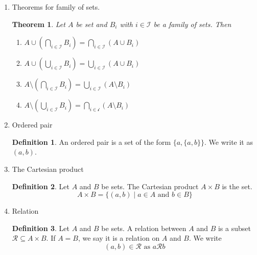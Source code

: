 \documentclass{article}
\theoremstyle{claim}
\newtheorem{theorem}{Theorem}[section]
\theoremstyle{definition}
\newtheorem{definition}{Definition}
\begin{document}
\begin{enumerate}
    \item[31.] Theorems for family of sets.
        \begin{theorem}
            Let $A$ be set and $B_i$ with $i \in \mathcal{I}$ be a family of sets. Then
            \begin{enumerate}
                \item[1.] $A \cup ( \bigcap\limits_{i \in \mathcal{I}} B_i ) = \bigcap\limits_{i \in \mathcal{I}} (A \cup B_i)$
                \item[2.] $A \cup ( \bigcup\limits_{i \in \mathcal{I}} B_i) = \bigcup\limits_{i \in \mathcal{I}} (A \cup B_i)$
                \item[3.] $A \setminus ( \bigcap\limits_{i \in \mathcal{I}} B_i ) = \bigcup\limits_{i \in \mathcal{I}} (A \setminus B_i)$
                \item[4.] $A \setminus ( \bigcup\limits_{i \in \mathcal{I}} B_i ) = \bigcap\limits_{i \in \mathcal{i}} (A \setminus B_i)$
            \end{enumerate}
        \end{theorem}

    \item[32.] Ordered pair
        \begin{definition}
            An ordered pair is a set of the form $\{ a, \{a, b\} \}$. We write it as $(a, b)$.
        \end{definition}

    \item[33.] The Cartesian product
        \begin{definition}
            Let $A$ and $B$ be sets. The Cartesian product $A \times B$ is the set.
            \begin{equation*}
                A \times B = \{ (a, b) \mid a \in A \text{ and } b \in B \}
            \end{equation*}
        \end{definition}

    \item[34.] Relation
        \begin{definition}
            Let $A$ and $B$ be sets. A relation between $A$ and $B$ is a subset $\mathcal{R} \subseteq A \times B$. If $A = B$, we say it is a relation on $A$ and $B$. We write
            \begin{equation*}
                (a, b) \in \mathcal{R} \text{ as } a \mathcal{R} b
            \end{equation*}
        \end{definition}


\end{enumerate}
\end{document}
